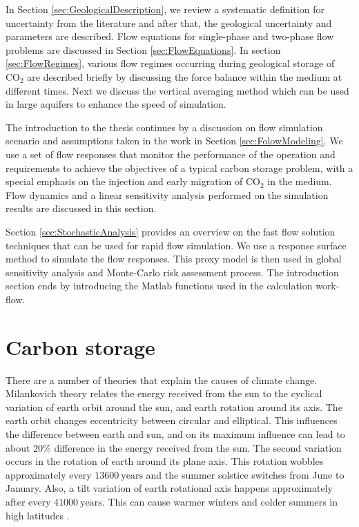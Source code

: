 In Section \ref{sec:GeologicalDescription}, we review a systematic definition
for uncertainty from the literature and after that, the geological uncertainty
and parameters are described. Flow equations for single-phase and two-phase flow
problems are discussed in Section \ref{sec:FlowEquations}. In section
\ref{sec:FlowRegimes}, various flow regimes occurring during geological storage
of $\mbox{CO}_2$ are described briefly by discussing the force balance within
the medium at different times. Next we discuss the vertical averaging method
which can be used in large aquifers to enhance the speed of simulation.

The introduction to the thesis continues by a discussion on flow simulation
scenario and assumptions taken in the work in Section \ref{sec:FolowModeling}.
We use a set of flow responses that monitor the performance of the operation and
requirements to achieve the objectives of a typical carbon storage problem, with
a special emphasis on the injection and early migration of $\mbox{CO}_2$ in the
medium. Flow dynamics and a linear sensitivity analysis performed on the
simulation results are discussed in this section. 

Section \ref{sec:StochasticAnalysis} provides an overview on the fast flow
solution
techniques that can be used for rapid flow simulation. We use a response surface
method to simulate the flow responses. This proxy model is then used in global
sensitivity analysis and Monte-Carlo risk assessment process. The introduction
section ends by introducing the Matlab functions used in the calculation
work-flow. 

\section{Carbon storage}
\label{sec:CarbonStorage}
There are a number of theories that explain the causes of climate change.
Milankovich theory \cite{foukal2006variations} relates the energy received from
the sun to the  cyclical variation of earth orbit around the sun, and earth
rotation around its axis. The earth orbit changes eccentricity between circular
and elliptical. This influences the difference between earth and sun, and on its
maximum influence can lead to about $20\%$ difference in the energy received
from the sun. The second variation occurs in the rotation of earth around its
plane axis. This rotation wobbles approximately every $13600~\mbox{years}$ and
the summer solstice switches from June to January. Also, a tilt variation of
earth rotational axis happens approximately after every $41000~\mbox{years}$.
This can cause warmer winters and colder summers in high latitudes
\cite{foukal2006variations}. 

